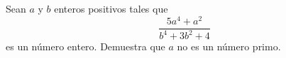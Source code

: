 Sean $a$ y $b$ enteros positivos tales que 
\[\frac{5a^4+a^2}{b^4+3b^2+4}\]
es un número entero. Demuestra que $a$ no es un número primo.